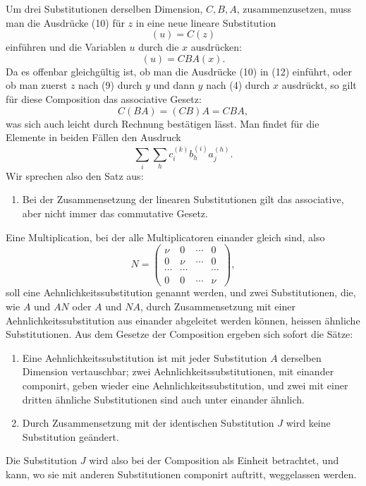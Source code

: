 \documentclass[11pt]{article}
\begin{document}
Um drei Substitutionen derselben Dimension, $C,B,A$, zusammenzusetzen, muss man die Ausdrücke (10) für $z$ in eine neue lineare Substitution
\begin{equation}
(u)=C(z)
\tag{12}
\end{equation}
einführen und die Variablen $u$ durch die $x$ ausdrücken:
\begin{equation}
(u)=CBA(x).
\tag{13}
\end{equation}
Da es offenbar gleichgültig ist, ob man die Ausdrücke (10) in (12) einführt, oder ob man zuerst $z$ nach (9) durch $y$ und dann $y$ nach (4) durch $x$ ausdrückt, so gilt für diese Composition das associative Gesetz:
\begin{equation}
C(BA)=(CB)A=CBA,
\tag{14}
\end{equation}
was sich auch leicht durch Rechnung bestätigen lässt. Man findet für die Elemente in beiden Fällen den Ausdruck
\[
\sum_i\sum_h c_i^{(k)}b_h^{(i)}a_j^{(h)}.
\]
Wir sprechen also den Satz aus:

\begin{enumerate}[label=\arabic*.,leftmargin=2.2em,start=3]
\item Bei der Zusammensetzung der linearen Substitutionen gilt das associative, aber nicht immer das commutative Gesetz.
\end{enumerate}

Eine Multiplication, bei der alle Multiplicatoren einander gleich sind, also
\[
N=\begin{pmatrix}
\nu&0&\cdots&0\\
0&\nu&\cdots&0\\
\cdots&\cdots&&\cdots\\
0&0&\cdots&\nu
\end{pmatrix},
\]
soll eine Aehnlichkeitssubstitution genannt werden, und zwei Substitutionen, die, wie $A$ und $AN$ oder $A$ und $NA$, durch Zusammensetzung mit einer Aehnlichkeitssubstitution aus einander abgeleitet werden können, heissen ähnliche Substitutionen. Aus dem Gesetze der Composition ergeben sich sofort die Sätze:

\begin{enumerate}[label=\arabic*.,leftmargin=2.2em,start=4]
\item Eine Aehnlichkeitssubstitution ist mit jeder Substitution $A$ derselben Dimension vertauschbar; zwei Aehnlichkeitssubstitutionen, mit einander componirt, geben wieder eine Aehnlichkeitssubstitution, und zwei mit einer dritten ähnliche Substitutionen sind auch unter einander ähnlich.

\item Durch Zusammensetzung mit der identischen Substitution $J$ wird keine Substitution geändert.
\end{enumerate}
Die Substitution $J$ wird also bei der Composition als Einheit betrachtet, und kann, wo sie mit anderen Substitutionen componirt auftritt, weggelassen werden.
\end{document}
